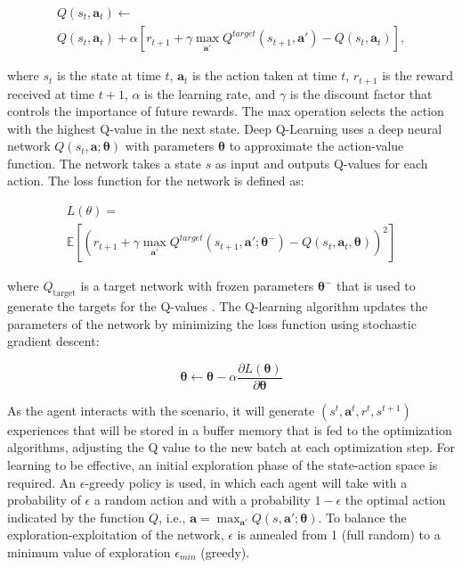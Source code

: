 \documentclass[journal]{IEEEtran}
\newcommand\vect[1]{\boldsymbol{#1}}
\begin{document}
\begin{equation}
\begin{split}
    Q(s_t, \vect{a}_t) \leftarrow  \\ 
    Q(s_t, \vect{a}_t) + \alpha \left[ r_{t+1} + \gamma \max_{\vect{a}'} Q^{target}(s_{t+1}, \vect{a}') - Q(s_t,\vect{a}_t)\right],
\end{split}
\end{equation}

where $s_t$ is the state at time $t$, $\vect{a}_t$ is the action taken at time $t$, $r_{t+1}$ is the reward received at time $t+1$, $\alpha$ is the learning rate, and $\gamma$ is the discount factor that controls the importance of future rewards. The max operation selects the action with the highest Q-value in the next state. 
Deep Q-Learning uses a deep neural network $Q(s_t,\vect{a}; \vect{\theta})$ with parameters $\vect{\theta}$ to approximate the action-value function. The network takes a state $s$ as input and outputs Q-values for each action. The loss function for the network is defined as:

\begin{equation}
\begin{split}
    L(\theta) = \\
    \mathbb{E} \left[ (r_{t+1} + \gamma  \max_{\vect{a}'} Q^{target}(s_{t+1}, \vect{a}'; \vect{\theta}^-) - Q(s_t, \vect{a}_t, \vect{\theta}))^2\right]    
\end{split}
\end{equation}

where $Q_{\text{target}}$ is a target network with frozen parameters $\vect{\theta}^{-}$ that is used to generate the targets for the Q-values \cite{mnih_human-level_2015}. The Q-learning algorithm updates the parameters of the network by minimizing the loss function using stochastic gradient descent:

\begin{equation}
    \vect{\theta} \leftarrow \vect{\theta} - \alpha \frac{\partial L(\vect{\theta})}{\partial \vect{\theta}}
\end{equation}

As the agent interacts with the scenario, it will generate $(s^t,\vect{a}^t,r^t,s^{t+1})$ experiences that will be stored in a buffer memory that is fed to the optimization algorithms, adjusting the Q value to the new batch at each optimization step. For learning to be effective, an initial exploration phase of the state-action space is required. An $\epsilon$-greedy policy is used, in which each agent will take with a probability of $\epsilon$ a random action and with a probability $1 - \epsilon$ the optimal action indicated by the function $Q$, i.e., $\vect{a} = \max_{\vect{a}'} Q(s,\vect{a}'; \vect{\theta})$. To balance the exploration-exploitation of the network, $\epsilon$ is annealed from 1 (full random) to a minimum value of exploration $\epsilon_{min}$ (greedy).
\end{document}

